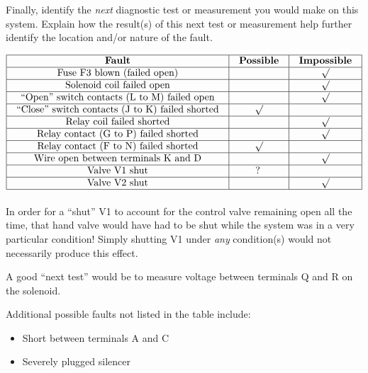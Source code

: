 Finally, identify the {\it next} diagnostic test or measurement you would make on this system.  Explain how the result(s) of this next test or measurement help further identify the location and/or nature of the fault.








$$\vbox{\offinterlineskip
\halign{\strut
\vrule \quad\hfil # \ \hfil & 
\vrule \quad\hfil # \ \hfil & 
\vrule \quad\hfil # \ \hfil \vrule \cr
\noalign{\hrule}
%
{\bf Fault} & {\bf Possible} & {\bf Impossible} \cr
%
\noalign{\hrule}
%
Fuse F3 blown (failed open) &  & $\surd$ \cr
%
\noalign{\hrule}
%
Solenoid coil failed open &  & $\surd$ \cr
%
\noalign{\hrule}
%
``Open'' switch contacts (L to M) failed open &  & $\surd$ \cr
%
\noalign{\hrule}
%
``Close'' switch contacts (J to K) failed shorted & $\surd$ &  \cr
%
\noalign{\hrule}
%
Relay coil failed shorted &  & $\surd$ \cr
%
\noalign{\hrule}
%
Relay contact (G to P) failed shorted &  & $\surd$ \cr
%
\noalign{\hrule}
%
Relay contact (F to N) failed shorted & $\surd$ &  \cr
%
\noalign{\hrule}
%
Wire open between terminals K and D &  & $\surd$ \cr
%
\noalign{\hrule}
%
Valve V1 shut & ? &  \cr
%
\noalign{\hrule}
%
Valve V2 shut &  & $\surd$ \cr
%
\noalign{\hrule}
} %
}$$ %

In order for a ``shut'' V1 to account for the control valve remaining open all the time, that hand valve would have had to be shut while the system was in a very particular condition!  Simply shutting V1 under {\it any} condition(s) would not necessarily produce this effect.

\vskip 10pt

A good ``next test'' would be to measure voltage between terminals Q and R on the solenoid.







Additional possible faults not listed in the table include:

\begin{itemize}
\item{} Short between terminals A and C 
\item{} Severely plugged silencer
\end{itemize}











